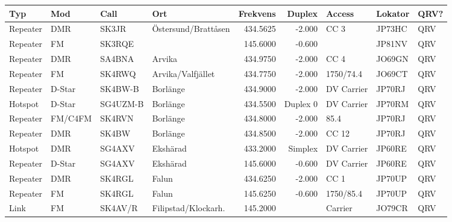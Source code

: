 \begin{landscape}
\begin{longtable}{llllrrlll}
	\bf Typ               & \bf Mod    & \bf Call & \bf Ort                & \bf Frekvens & \bf Duplex & \bf Access        & \bf Lokator & \bf QRV? \\ \hline
	\endhead
    Repeater & DMR        & SK3JR    & Östersund/Brattåsen    &     434.5625 &     -2.000 & CC 3              & JP73HC      & QRV      \\
	Repeater              & FM         & SK3RQE   &                        &     145.6000 &     -0.600 &                   & JP81NV      & QRV      \\
	Repeater              & DMR        & SA4BNA   & Arvika                 &     434.9750 &     -2.000 & CC 4              & JO69GN      & QRV      \\
	Repeater              & FM         & SK4RWQ   & Arvika/Valfjället      &     434.7750 &     -2.000 & 1750/74.4         & JO69CT      & QRV      \\
	Repeater              & D-Star     & SK4BW-B  & Borlänge               &     434.9000 &     -2.000 & DV Carrier        & JP70RJ      & QRV      \\
	Hotspot               & D-Star     & SG4UZM-B & Borlänge               &     434.5500 &   Duplex 0 & DV Carrier        & JP70RM      & QRV      \\
	Repeater              & FM/C4FM    & SK4RVN   & Borlänge               &     434.8000 &     -2.000 & 85.4              & JP70RJ      & QRV      \\
	Repeater              & DMR        & SK4BW    & Borlänge               &     434.8500 &     -2.000 & CC 12             & JP70RJ      & QRV      \\
	Hotspot               & DMR        & SG4AXV   & Ekshärad               &     433.2000 &    Simplex & DV Carrier        & JP60RE      & QRV      \\
	Repeater              & D-Star     & SG4AXV   & Ekshärad               &     145.6000 &     -0.600 & DV Carrier        & JP60RE      & QRV      \\
	Repeater              & DMR        & SK4RGL   & Falun                  &     434.6250 &     -2.000 & CC 1              & JP70UP      & QRV      \\
	Repeater              & FM         & SK4RGL   & Falun                  &     145.6250 &     -0.600 & 1750/85.4         & JP70UP      & QRV      \\
	Link                  & FM         & SK4AV/R  & Filipstad/Klockarh.    &     145.2000 &            & Carrier           & JO79CR      & QRV      \\

\end{longtable}
\end{landscape}

